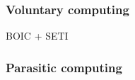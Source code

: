 \subsubsection{Voluntary computing}
\label{sec:bg:crowd:auto:voluntary}
BOIC + SETI

\subsubsection{Parasitic computing}
\label{sec:bg:crowd:auto:parasitic}
